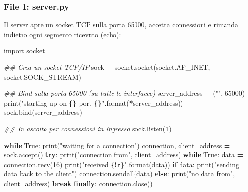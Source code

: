 \documentclass[
  italian,
  openany]{book}
\newenvironment{Shaded}{\begin{snugshade}}{\end{snugshade}}
\newcommand{\BuiltInTok}[1]{#1}
\newcommand{\CommentTok}[1]{\textcolor[rgb]{0.56,0.35,0.01}{\textit{#1}}}
\newcommand{\ControlFlowTok}[1]{\textcolor[rgb]{0.13,0.29,0.53}{\textbf{#1}}}
\newcommand{\DecValTok}[1]{\textcolor[rgb]{0.00,0.00,0.81}{#1}}
\newcommand{\ImportTok}[1]{#1}
\newcommand{\NormalTok}[1]{#1}
\newcommand{\OperatorTok}[1]{\textcolor[rgb]{0.81,0.36,0.00}{\textbf{#1}}}
\newcommand{\SpecialCharTok}[1]{\textcolor[rgb]{0.81,0.36,0.00}{\textbf{#1}}}
\newcommand{\StringTok}[1]{\textcolor[rgb]{0.31,0.60,0.02}{#1}}
\newcommand{\VariableTok}[1]{\textcolor[rgb]{0.00,0.00,0.00}{#1}}
\begin{document}
\subsubsection{File 1: server.py}\label{file-1-server.py}

Il server apre un socket TCP sulla porta 65000, accetta connessioni e
rimanda indietro ogni segmento ricevuto (echo):

\begin{Shaded}
\begin{Highlighting}[]
\ImportTok{import}\NormalTok{ socket}

\CommentTok{\#\# Crea un socket TCP/IP}
\NormalTok{sock }\OperatorTok{=}\NormalTok{ socket.socket(socket.AF\_INET, socket.SOCK\_STREAM)}

\CommentTok{\#\# Bind sulla porta 65000 (su tutte le interfacce)}
\NormalTok{server\_address }\OperatorTok{=}\NormalTok{ (}\StringTok{""}\NormalTok{, }\DecValTok{65000}\NormalTok{)}
\BuiltInTok{print}\NormalTok{(}\StringTok{"starting up on }\SpecialCharTok{\{\}}\StringTok{ port }\SpecialCharTok{\{\}}\StringTok{"}\NormalTok{.}\BuiltInTok{format}\NormalTok{(}\OperatorTok{*}\NormalTok{server\_address))}
\NormalTok{sock.bind(server\_address)}

\CommentTok{\#\# In ascolto per connessioni in ingresso}
\NormalTok{sock.listen(}\DecValTok{1}\NormalTok{)}

\ControlFlowTok{while} \VariableTok{True}\NormalTok{:}
    \BuiltInTok{print}\NormalTok{(}\StringTok{"waiting for a connection"}\NormalTok{)}
\NormalTok{    connection, client\_address }\OperatorTok{=}\NormalTok{ sock.accept()}
    \ControlFlowTok{try}\NormalTok{:}
        \BuiltInTok{print}\NormalTok{(}\StringTok{"connection from"}\NormalTok{, client\_address)}
        \ControlFlowTok{while} \VariableTok{True}\NormalTok{:}
\NormalTok{            data }\OperatorTok{=}\NormalTok{ connection.recv(}\DecValTok{16}\NormalTok{)}
            \BuiltInTok{print}\NormalTok{(}\StringTok{"received }\SpecialCharTok{\{!r\}}\StringTok{"}\NormalTok{.}\BuiltInTok{format}\NormalTok{(data))}
            \ControlFlowTok{if}\NormalTok{ data:}
                \BuiltInTok{print}\NormalTok{(}\StringTok{"sending data back to the client"}\NormalTok{)}
\NormalTok{                connection.sendall(data)}
            \ControlFlowTok{else}\NormalTok{:}
                \BuiltInTok{print}\NormalTok{(}\StringTok{"no data from"}\NormalTok{, client\_address)}
                \ControlFlowTok{break}
    \ControlFlowTok{finally}\NormalTok{:}
\NormalTok{        connection.close()}
\end{Highlighting}
\end{Shaded}
\end{document}
